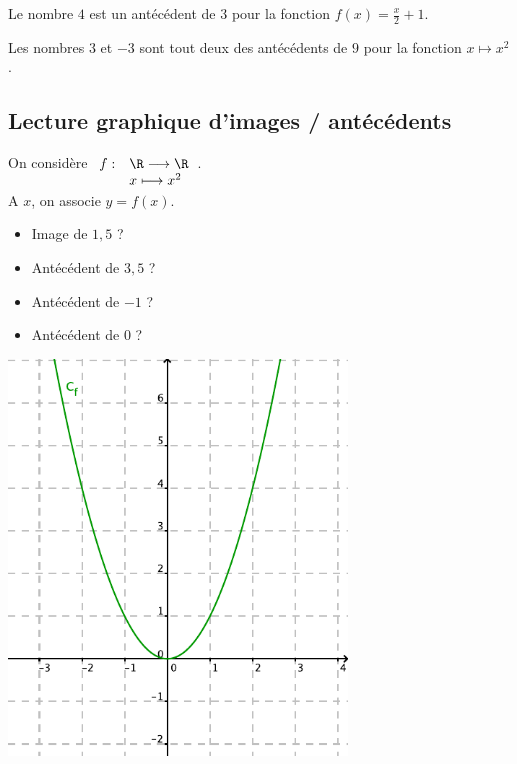 \begin{example}
    Le nombre \( 4\) est un antécédent de \( 3\) pour la fonction \( f(x)=\frac{ x }{ 2 }+1\).
\end{example}

\begin{example}
    Les nombres \( 3\) et \( -3\) sont tout deux des antécédents de \( 9\) pour la fonction \( x\mapsto x^2\).
\end{example}

\subsection{Lecture graphique d'images / antécédents}

\begin{minipage}[c]{0.4\linewidth}
  On considère 
  $
  \begin{array}[t]{cl}
    f : & \R \longrightarrow \R \\
    & x \longmapsto x^2
  \end{array}
  $.  \\

  A $x$, on associe $y=f(x)$. 

  \vspace{1cm}

  \begin{itemize}
  \item[\textbullet] Image de $1,5$ ? \\[2em]
  \item[\textbullet] Antécédent de $3,5$ ?  \\[2em]
  \item[\textbullet] Antécédent de $-1$ ? \\[2em]
  \item[\textbullet] Antécédent de $0$ ?  \\[2em]
  \end{itemize}
  
\end{minipage}
\begin{minipage}[c]{0.6\linewidth}
  \includegraphics[width=9cm]{F_Carre2.pdf}  
\end{minipage} \\


